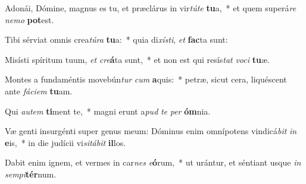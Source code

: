 \item Adonái, Dómine, magnus es tu, et præclárus in vir\textit{tú}\textit{te} \textbf{tu}a,~* et quem superá\textit{re} \textit{ne}\textit{mo} \textbf{pot}est.
\item Tibi sérviat omnis crea\textit{tú}\textit{ra} \textbf{tu}a:~* quia di\textit{xís}\textit{ti}, \textit{et} \textbf{fac}ta sunt:
\item Misísti spíritum tuum, \textit{et} \textit{cre}\textbf{á}ta sunt,~* et non est qui resís\textit{tat} \textit{vo}\textit{ci} \textbf{tu}æ.
\item Montes a fundaméntis movebún\textit{tur} \textit{cum} \textbf{a}quis:~* petræ, sicut cera, liquéscent ante \textit{fá}\textit{ci}\textit{em} \textbf{tu}am.
\item Qui \textit{au}\textit{tem} \textbf{ti}ment te,~* magni erunt a\textit{pud} \textit{te} \textit{per} \textbf{óm}nia.
\item Væ genti insurgénti super genus meum: Dóminus enim omnípotens vindicá\textit{bit} \textit{in} \textbf{e}is,~* in die judícii vi\textit{si}\textit{tá}\textit{bit} \textbf{il}los.
\item Dabit enim ignem, et vermes in car\textit{nes} \textit{e}\textbf{ó}rum,~* ut urántur, et séntiant usque \textit{in} \textit{sem}\textit{pi}\textbf{tér}num.
